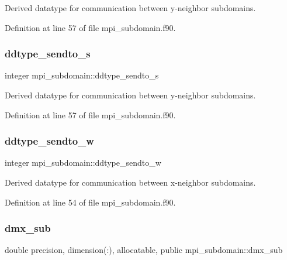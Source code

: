 Derived datatype for communication between y-\/neighbor subdomains. 



Definition at line 57 of file mpi\+\_\+subdomain.\+f90.

\mbox{\label{namespacempi__subdomain_a660f83d621188fb7eb60ad10eab4c9b5}} 
\subsubsection{\texorpdfstring{ddtype\_sendto\_s}{ddtype\_sendto\_s}}
{\footnotesize\ttfamily integer mpi\+\_\+subdomain\+::ddtype\+\_\+sendto\+\_\+s}



Derived datatype for communication between y-\/neighbor subdomains. 



Definition at line 57 of file mpi\+\_\+subdomain.\+f90.

\mbox{\label{namespacempi__subdomain_a0701fde01daea1a6fd51b62c75b8ee82}} 
\subsubsection{\texorpdfstring{ddtype\_sendto\_w}{ddtype\_sendto\_w}}
{\footnotesize\ttfamily integer mpi\+\_\+subdomain\+::ddtype\+\_\+sendto\+\_\+w}



Derived datatype for communication between x-\/neighbor subdomains. 



Definition at line 54 of file mpi\+\_\+subdomain.\+f90.

\mbox{\label{namespacempi__subdomain_a56af1740899dc9df6868e5e71a0884a5}} 
\subsubsection{\texorpdfstring{dmx\_sub}{dmx\_sub}}
{\footnotesize\ttfamily double precision, dimension(\+:), allocatable, public mpi\+\_\+subdomain\+::dmx\+\_\+sub}




